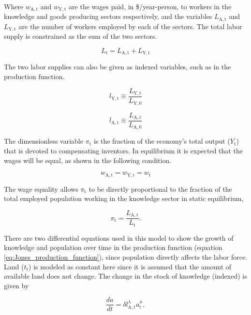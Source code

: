 \documentclass[letterpaper,12pt]{article}
\begin{document}
Where $w_\mathrm{A,t}$ and $w_\mathrm{Y,t}$ are the wages paid, in \$/year-person, to workers in the knowledge and goods producing sectors respectively, and the variables $L_\mathrm{A,t}$ and $L_\mathrm{Y,t}$ are the number of workers employed by each of the sectors. The total labor supply is constrained as the sum of the two sectors.

\begin{equation} \label{labor_supply}
	L_\mathrm{t} = L_\mathrm{A,t} + L_\mathrm{Y,t}
\end{equation}

The two labor supplies can also be given as indexed variables, such as in the production function.

\begin{equation}
	l_\mathrm{Y,t} \equiv \frac{L_\mathrm{Y,t}}{L_\mathrm{Y,0}}
\end{equation}

\begin{equation}
	l_\mathrm{A,t} \equiv \frac{L_\mathrm{A,t}}{L_\mathrm{A,0}}
\end{equation}

The dimensionless variable $\pi_\mathrm{t}$ is the fraction of the economy's total output ($Y_\mathrm{t}$) that is devoted to compensating inventors. In equilibrium it is expected that the wages will be equal, as shown in the following condition.

\begin{equation} \label{eq:wage_equality}
	w_\mathrm{A,t} = w_\mathrm{Y,t} = w_\mathrm{t}
\end{equation}

The wage equality allows $\pi_\mathrm{t}$ to be directly proportional to the fraction of the total employed population working in the knowledge sector in static equilibrium,

\begin{equation} \label{eq:pi}
	\pi_\mathrm{t} = \frac{L_\mathrm{A,t}}{L_\mathrm{t}}.
\end{equation}

There are two differential equations used in this model to show the growth of knowledge and population over time in the production function (equation \ref{eq:Jones_production_function}), since population directly affects the labor force. Land ($t_\mathrm{t}$) is modeled as constant here since it is assumed that the amount of available land does not change. The change in the stock of knowledge (indexed) is given by

\begin{equation} \label{eq:da_dt}
	\frac{da}{dt} = \delta l_\mathrm{A,t}^\lambda a_\mathrm{t}^\phi,
\end{equation}
\end{document}
